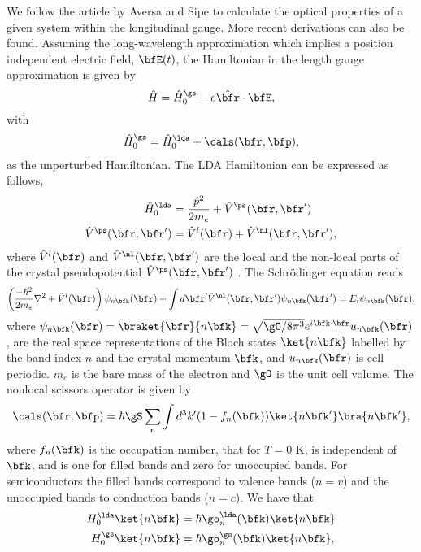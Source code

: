 \documentclass[floatfix,prb,aps,superscriptaddress,11pt,preprint,letterpaper]{revtex4}
\begin{document}
We follow the article by Aversa and Sipe\cite{aversaPRB95} to calculate 
the optical properties of a given system within the longitudinal gauge. 
More recent derivations\cite{sipe_second-order_2000,lambrechtPSSB00} 
can also be found. Assuming the long-wavelength approximation which implies 
a position independent electric field, 
$\bfE(t)$,  
the Hamiltonian in the length gauge approximation is given by
\begin{equation}\label{ache}
\hat{H}=\hat{H}^\gs_0-e \hat\bfr \cdot \bfE,
\end{equation}
with
\begin{align}\label{ache.1}
\hat H^\gs_0=\hat H^\lda_0
 + \cals(\bfr,\bfp)
,
\end{align} 
as the unperturbed Hamiltonian.
The LDA Hamiltonian can be expressed as follows,
\begin{align}\label{ache.2}
\hat H^\lda_0&=\frac{\hat p^2}{2m_e}  + \hat V^\ps(\bfr,\bfr')
\nonumber\\
\hat V^\ps(\bfr,\bfr')
&=\hat V^l(\bfr) + \hat V^\nl(\bfr,\bfr')
,
\end{align}  
where $\hat V^l(\bfr)$ and $\hat V^\nl(\bfr,\bfr')$ are the local and
the non-local parts of the  
crystal 
pseudopotential $\hat V^\ps(\bfr,\bfr')$ .
The Schr\"odinger equation reads
\begin{align}\label{ache.4} 
\left(
\frac{-\hbar^2}{2m_e}\nabla^2
 + \hat V^l(\bfr)\right)\psi_{n\bfk}(\bfr)
 + \int d\bfr'\hat V^\nl(\bfr,\bfr')\psi_{n\bfk}(\bfr')
=E_i\psi_{n\bfk}(\bfr)
,
\end{align} 
where
$\psi_{n\bfk}(\bfr)=\braket{\bfr}{n\bfk}=\sqrt{\gO/8\pi^3}e^{i\bfk\cdot\bfr}u_{n\bfk}(\bfr)$,
are the real space representations of the Bloch states $\ket{n\bfk}$ labelled
by the band index $n$ and the crystal momentum $\bfk$, and $u_{n\bfk}(\bfr)$
is cell periodic. $m_e$ is the bare mass of the electron and $\gO$ is the 
unit cell volume. The nonlocal scissors operator is given by 
\begin{equation}\label{chon.0}
\cals(\bfr,\bfp)=\hbar\gS\sum_n\int d^3k'(1-f_n(\bfk)) \ket{n\bfk'}\bra{n\bfk'}
,
\end{equation}
where $f_n(\bfk)$ is the occupation number, that for $T=0$ K, is
independent of $\bfk$, and is one for filled bands and zero for
unoccupied bands. For semiconductors the filled bands correspond to
valence
bands  ($n=v$) and the unoccupied bands to conduction bands
 ($n=c$). 
We have that
\begin{align}\label{chon.1}  
H^\lda_0\ket{n\bfk}&=\hbar\go^\lda_n(\bfk)\ket{n\bfk}
\nonumber\\
H^\gs_0\ket{n\bfk}&=\hbar\go^\gs_n(\bfk)\ket{n\bfk}
,
\end{align} 
\end{document}
